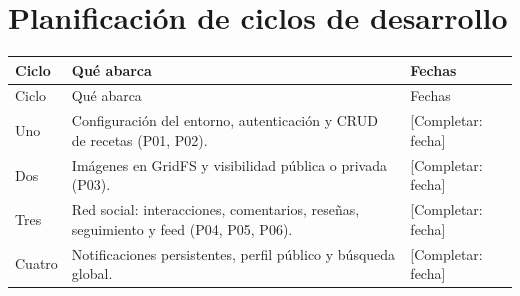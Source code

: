 \chapter{Planificación de ciclos de desarrollo}
\label{ch:planificacion}

\begin{center}
\begin{longtable}{p{1.9cm}p{8.4cm}p{3cm}}
  \toprule
  Ciclo & Qué abarca & Fechas \\
  \midrule
  \endfirsthead
  \toprule
  Ciclo & Qué abarca & Fechas \\
  \midrule
  \endhead
  Uno & Configuración del entorno, autenticación y CRUD de recetas (P01, P02). & [Completar: fecha] \\
  Dos & Imágenes en GridFS y visibilidad pública o privada (P03). & [Completar: fecha] \\
  Tres & Red social: interacciones, comentarios, reseñas, seguimiento y feed (P04, P05, P06). & [Completar: fecha] \\
  Cuatro & Notificaciones persistentes, perfil público y búsqueda global. & [Completar: fecha] \\
  \bottomrule
\end{longtable}
\end{center}
